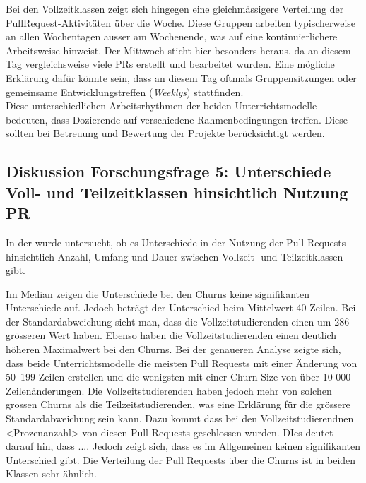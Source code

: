 Bei den Vollzeitklassen zeigt sich hingegen eine gleichmässigere Verteilung der PullRequest-Aktivitäten über die Woche. Diese Gruppen arbeiten typischerweise an allen Wochentagen ausser am Wochenende, was auf eine kontinuierlichere Arbeitsweise hinweist. Der Mittwoch sticht hier besonders heraus, da an diesem Tag vergleichsweise viele PRs erstellt und bearbeitet wurden. Eine mögliche Erklärung dafür könnte sein, dass an diesem Tag oftmals Gruppensitzungen oder gemeinsame Entwicklungstreffen (\textit{Weeklys}) stattfinden. \\
Diese unterschiedlichen Arbeitsrhythmen der beiden Unterrichtsmodelle bedeuten, dass Dozierende auf verschiedene Rahmenbedingungen treffen. Diese sollten bei Betreuung und Bewertung der Projekte berücksichtigt werden.

\subsection{Diskussion Forschungsfrage 5: Unterschiede Voll- und Teilzeitklassen hinsichtlich Nutzung PR}
In der  wurde untersucht, ob es Unterschiede in der Nutzung der Pull Requests hinsichtlich Anzahl, Umfang und Dauer zwischen Vollzeit- und Teilzeitklassen gibt.

Im Median zeigen die Unterschiede bei den Churns keine signifikanten Unterschiede auf. Jedoch beträgt der Unterschied beim Mittelwert 40 Zeilen. Bei der Standardabweichung sieht man, dass die Vollzeitstudierenden einen um 286 grösseren Wert haben. Ebenso haben die Vollzeitstudierenden einen deutlich höheren Maximalwert bei den Churns. Bei der genaueren Analyse zeigte sich, dass beide Unterrichtsmodelle die meisten Pull Requests mit einer Änderung von 50–199 Zeilen erstellen und die wenigsten mit einer Churn-Size von über 10 000 Zeilenänderungen. Die Vollzeitstudierenden haben jedoch mehr von solchen grossen Churns als die Teilzeitstudierenden, was eine Erklärung für die grössere Standardabweichung sein kann. Dazu kommt dass bei den Vollzeitstudierendnen <Prozenanzahl> von diesen Pull Requests geschlossen wurden. DIes deutet darauf hin, dass .... Jedoch zeigt sich, dass es im Allgemeinen keinen signifikanten Unterschied gibt. Die Verteilung der Pull Requests über die Churns ist in beiden Klassen sehr ähnlich. 

